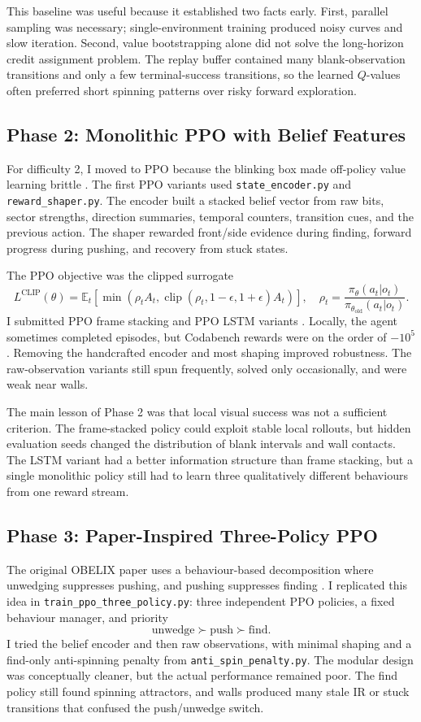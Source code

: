 \documentclass[11pt, oneside]{article}
\begin{document}
This baseline was useful because it established two facts early. First, parallel sampling was necessary; single-environment training produced noisy curves and slow iteration. Second, value bootstrapping alone did not solve the long-horizon credit assignment problem. The replay buffer contained many blank-observation transitions and only a few terminal-success transitions, so the learned \(Q\)-values often preferred short spinning patterns over risky forward exploration.

\subsection*{Phase 2: Monolithic PPO with Belief Features}
For difficulty 2, I moved to PPO because the blinking box made off-policy value learning brittle \citep{schulman2017ppo}. The first PPO variants used \texttt{state\_encoder.py} and \texttt{reward\_shaper.py}. The encoder built a stacked belief vector from raw bits, sector strengths, direction summaries, temporal counters, transition cues, and the previous action. The shaper rewarded front/side evidence during finding, forward progress during pushing, and recovery from stuck states.

The PPO objective was the clipped surrogate
\[
L^{\mathrm{CLIP}}(\theta)=
\mathbb{E}_t\left[
\min\left(\rho_t A_t,\operatorname{clip}(\rho_t,1-\epsilon,1+\epsilon)A_t\right)
\right],
\quad
\rho_t=\frac{\pi_\theta(a_t|o_t)}{\pi_{\theta_{\mathrm{old}}}(a_t|o_t)}.
\]
I submitted PPO frame stacking and PPO LSTM variants \citep{hochreiter1997lstm}. Locally, the agent sometimes completed episodes, but Codabench rewards were on the order of \(-10^5\). Removing the handcrafted encoder and most shaping improved robustness. The raw-observation variants still spun frequently, solved only occasionally, and were weak near walls.

The main lesson of Phase 2 was that local visual success was not a sufficient criterion. The frame-stacked policy could exploit stable local rollouts, but hidden evaluation seeds changed the distribution of blank intervals and wall contacts. The LSTM variant had a better information structure than frame stacking, but a single monolithic policy still had to learn three qualitatively different behaviours from one reward stream.

\subsection*{Phase 3: Paper-Inspired Three-Policy PPO}
The original OBELIX paper uses a behaviour-based decomposition where unwedging suppresses pushing, and pushing suppresses finding \citep{mahadevan1991obelix}. I replicated this idea in \texttt{train\_ppo\_three\_policy.py}: three independent PPO policies, a fixed behaviour manager, and priority
\[
\text{unwedge} \succ \text{push} \succ \text{find}.
\]
I tried the belief encoder and then raw observations, with minimal shaping and a find-only anti-spinning penalty from \texttt{anti\_spin\_penalty.py}. The modular design was conceptually cleaner, but the actual performance remained poor. The find policy still found spinning attractors, and walls produced many stale IR or stuck transitions that confused the push/unwedge switch.
\end{document}
